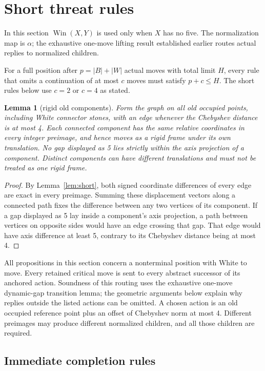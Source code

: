 \documentclass[11pt]{article}
\newtheorem{lemma}[theorem]{Lemma}
\theoremstyle{definition}
\theoremstyle{remark}
\newcommand{\A}{\alpha}
\newcommand{\Win}{\operatorname{Win}}
\begin{document}
\section{Short threat rules}\label{sec:short}
In this section $\Win(X,Y)$ is used only when $X$ has no five. The normalization map is $\A$; the exhaustive one-move lifting result established earlier routes actual replies to normalized children.

For a full position after $p=|B|+|W|$ actual moves with total limit $H$, every rule that omits a continuation of at most $c$ moves must satisfy $p+c\le H$. The short rules below use $c=2$ or $c=4$ as stated.

\begin{lemma}[rigid old components]\label{mac:rigid-frame}
Form the graph on all old occupied points, including White connector stones, with an edge whenever the Chebyshev distance is at most 4. Each connected component has the same relative coordinates in every integer preimage, and hence moves as a rigid frame under its own translation. No gap displayed as 5 lies strictly within the axis projection of a component. Distinct components can have different translations and must not be treated as one rigid frame.
\end{lemma}
\begin{proof}
By Lemma~\ref{lem:short}, both signed coordinate differences of every edge are exact in every preimage. Summing these displacement vectors along a connected path fixes the difference between any two vertices of its component. If a gap displayed as 5 lay inside a component's axis projection, a path between vertices on opposite sides would have an edge crossing that gap. That edge would have axis difference at least 5, contrary to its Chebyshev distance being at most 4.
\end{proof}

All propositions in this section concern a nonterminal position with White to move. Every retained critical move is sent to every abstract successor of its anchored action. Soundness of this routing uses the exhaustive one-move dynamic-gap transition lemma; the geometric arguments below explain why replies outside the listed actions can be omitted. A chosen action is an old occupied reference point plus an offset of Chebyshev norm at most 4. Different preimages may produce different normalized children, and all those children are required.

\subsection{Immediate completion rules}
\end{document}
